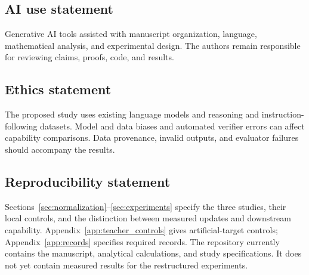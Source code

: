 \subsection*{AI use statement}
Generative AI tools assisted with manuscript organization, language,
mathematical analysis, and experimental design. The authors remain
responsible for reviewing claims, proofs, code, and results.

\subsection*{Ethics statement}
The proposed study uses existing language models and reasoning and
instruction-following datasets. Model and data biases and automated
verifier errors can affect capability comparisons. Data provenance,
invalid outputs, and evaluator failures should accompany the results.

\subsection*{Reproducibility statement}
Sections~\ref{sec:normalization}--\ref{sec:experiments} specify the three
studies, their local controls, and the distinction between measured
updates and downstream capability. Appendix~\ref{app:teacher_controls}
gives artificial-target controls; Appendix~\ref{app:records} specifies
required records. The repository currently contains the manuscript,
analytical calculations, and study specifications. It does not yet
contain measured results for the restructured experiments.
